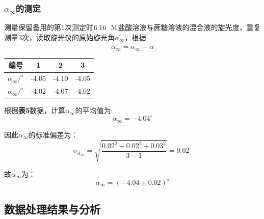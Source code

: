 \documentclass[12pt]{article}
\begin{document}
			\subsubsection{$\alpha_{\infty}$的测定}
			测量保留备用的第1次测定时$6.16\ \ {\rm M}$盐酸溶液与蔗糖溶液的混合液的旋光度，重复测量3次，读取旋光仪的原始旋光角$\alpha^{\prime}_{\infty}$，根据
			$$
			\alpha_{\infty}=\alpha^{\prime}_{\infty}-\alpha
			$$
			\begin{table}[!h]
				\centering
				\begin{tabular}{cccc}
					\toprule
					编号 & 1 & 2 & 3 \\
					\midrule
					$\alpha^{\prime}_{\infty} / ^{\circ}$ & -4.05 & -4.10 & -4.05 \\
							$\alpha_{\infty} / ^{\circ}$ & -4.02 & -4.07 & -4.02 \\
					\bottomrule
				\end{tabular}
			\end{table}
			\par
			根据\textbf{表5}数据，计算$\alpha_{\infty}$的平均值为:
			$$
			\alpha_{\infty}=-4.04^{\circ}
			$$\par
			因此$\alpha_{\infty}$的标准偏差为：
			$$
			\sigma_{\alpha_{\infty}}=\sqrt{\frac{0.02^{2}+0.02^{2}+0.03^{2}}{3-1}}=0.02^{\circ}
			$$\par
			故$\alpha_{\infty}$为：
			$$
			\alpha_{\infty}=(-4.04\pm 0.02)^{\circ}
			$$\par


		\subsection{数据处理结果与分析}
\end{document}
